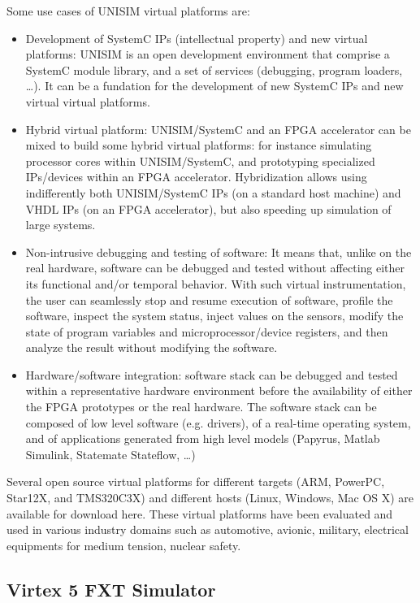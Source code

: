 \noindent Some use cases of UNISIM virtual platforms are:
\begin{itemize}
\item Development of SystemC IPs (intellectual property) and new virtual platforms: UNISIM is an open development environment that comprise a SystemC module library, and a set of services (debugging, program loaders, …). It can be a fundation for the development of new SystemC IPs and new virtual virtual platforms.
\item Hybrid virtual platform: UNISIM/SystemC and an FPGA accelerator can be mixed to build some hybrid virtual platforms: for instance simulating processor cores within UNISIM/SystemC, and prototyping specialized IPs/devices within an FPGA accelerator. Hybridization allows using indifferently both UNISIM/SystemC IPs (on a standard host machine) and VHDL IPs (on an FPGA accelerator), but also speeding up simulation of large systems.
\item Non-intrusive debugging and testing of software: It means that, unlike on the real hardware, software can be debugged and tested without affecting either its functional and/or temporal behavior. With such virtual instrumentation, the user can seamlessly stop and resume execution of software, profile the software, inspect the system status, inject values on the sensors, modify the state of program variables and microprocessor/device registers, and then analyze the result without modifying the software.
\item Hardware/software integration: software stack can be debugged and tested within a representative hardware environment before the availability of either the FPGA prototypes or the real hardware. The software stack can be composed of low level software (e.g. drivers), of a real-time operating system, and of applications generated from high level models (Papyrus, Matlab Simulink, Statemate Stateflow, …)
\end{itemize}

Several open source virtual platforms for different targets (ARM, PowerPC, Star12X, and TMS320C3X) and different hosts (Linux, Windows, Mac OS X) are available for download here. These virtual platforms have been evaluated and used in various industry domains such as automotive, avionic, military, electrical equipments for medium tension, nuclear safety.

\subsection{Virtex 5 FXT Simulator}


